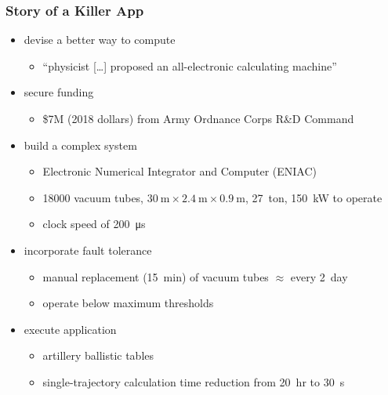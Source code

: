
\begin{frame}
  \frametitle{Story of a Killer App}
  \begin{itemize}[<+->]
  \item devise a better way to compute 
    \begin{itemize}[<6->]
    \item ``physicist [\ldots] proposed an all-electronic calculating machine''
    \end{itemize}
  \item secure funding 
    \begin{itemize}[<6->]
    \item \$7M (2018 dollars) from Army Ordnance Corps R\&D Command
    \end{itemize}
  \item build a complex system 
    \begin{itemize}[<6->]
    \item Electronic Numerical Integrator and Computer (ENIAC)
    \item \num{18000} vacuum tubes, $\SI{30}{\meter} \times \SI{2.4}{\meter} \times \SI{0.9}{\meter}$, \SI{27}{ton}, \SI{150}{\kilo\watt} to operate
    \item clock speed of \SI{200}{\micro\second}
    \end{itemize}
  \item incorporate fault tolerance 
    \begin{itemize}[<6->]
    \item manual replacement (\SI{15}{min}) of vacuum tubes $\approx$ every \SI{2}{day}
    \item operate below maximum thresholds
    \end{itemize}
  \item execute application 
    \begin{itemize}[<6->]
    \item artillery ballistic tables
    \item single-trajectory calculation time reduction from \SI{20}{hr} to \SI{30}{\second}
    \end{itemize}
  \end{itemize}
\end{frame}
